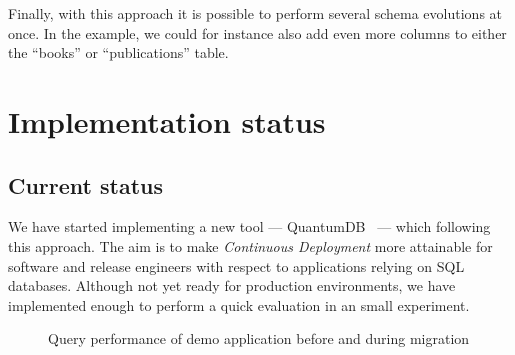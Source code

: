 \documentclass[conference]{IEEEtran}
\begin{document}
Finally, with this approach it is possible to perform several schema evolutions at once. In the example, we could for instance also add even more columns to either the ``books'' or ``publications'' table.

\section{Implementation status} %

\subsection{Current status}

We have started implementing a new tool --- QuantumDB~\cite{QuantumDB} --- which following this approach. The aim is to make \textit{Continuous Deployment} more attainable for software and release engineers with respect to applications relying on SQL databases. Although not yet ready for production environments, we have implemented enough to perform a quick evaluation in an small experiment. 

\begin{figure}%
    \centering
    \qquad
    \qquad
    \caption{Query performance of demo application before and during migration}%
    \label{fig:migration-stages}%
\end{figure}
\end{document}
